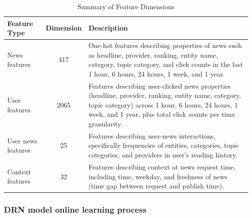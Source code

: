 \documentclass{ieeetj}
\begin{document}
\begin{table}[ht]
    \centering
    \caption{Summary of Feature Dimensions}
    \begin{tabularx}{\columnwidth}{|l|c|X|}
    \hline
    \textbf{Feature Type} & \textbf{Dimension} & \textbf{Description} \\ \hline
    News features & 417 & One-hot features describing properties of news such as headline, provider, ranking, entity name, category, topic category, and click counts in the last 1 hour, 6 hours, 24 hours, 1 week, and 1 year. \\ \hline
    User features & 2065 & Features describing user-clicked news properties (headline, provider, ranking, entity name, category, topic category) across 1 hour, 6 hours, 24 hours, 1 week, and 1 year, plus total click counts per time granularity. \\ \hline
    User news features & 25 & Features describing user-news interactions, specifically frequencies of entities, categories, topic categories, and providers in user's reading history. \\ \hline
    Context features & 32 & Features describing context at news request time, including time, weekday, and freshness of news (time gap between request and publish time). \\ \hline
    \end{tabularx}
    \label{tab:feature-summary}
\end{table}


\FloatBarrier
\subsubsection{DRN model online learning process}

\end{document}
